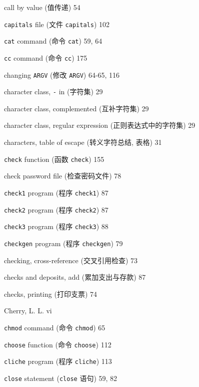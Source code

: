 \begin{multicols}{2}
\hangindent=2pc  call by value (值传递) 54

\hangindent=2pc  \verb'capitals' file (文件 \verb'capitals') 102

\hangindent=2pc  \verb'cat' command (命令 \verb'cat') 59, 64

\hangindent=2pc  \verb'cc' command (命令 \verb'cc') 175

\hangindent=2pc  changing \verb'ARGV' (修改 \verb'ARGV') 64-65, 116

\hangindent=2pc  character class, \verb'-' in (字符集) 29

\hangindent=2pc  character class, complemented (互补字符集) 29

\hangindent=2pc  character class, regular expression
(正则表达式中的字符集) 29

\hangindent=2pc  characters, table of escape (转义字符总结,
表格) 31

\hangindent=2pc  \verb'check' function (函数 \verb'check') 155

\hangindent=2pc  check password file (检查密码文件) 78

\hangindent=2pc  \verb'check1' program (程序 \verb'check1') 87

\hangindent=2pc  \verb'check2' program (程序 \verb'check2') 87

\hangindent=2pc  \verb'check3' program (程序 \verb'check3') 88

\hangindent=2pc  \verb'checkgen' program (程序 \verb'checkgen') 79

\hangindent=2pc  checking, cross-reference (交叉引用检查) 73

\hangindent=2pc  checks and deposits, add (累加支出与存款) 87

\hangindent=2pc  checks, printing (打印支票) 74

\hangindent=2pc  Cherry, L. L. vi

\hangindent=2pc  \verb'chmod' command (命令 \verb'chmod') 65

\hangindent=2pc  \verb'choose' function (命令 \verb'choose') 112

\hangindent=2pc  \verb'cliche' program (程序 \verb'cliche') 113

\hangindent=2pc  \verb'close' statement (\verb'close' 语句) 59, 82


\end{multicols}
